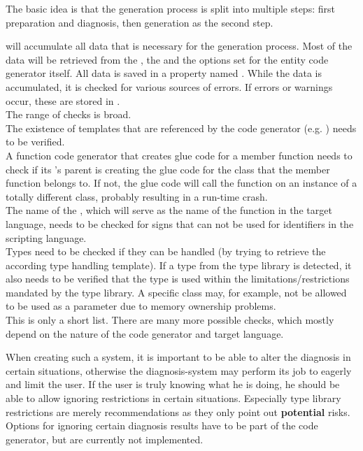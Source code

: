 The basic idea is that the generation process is split into multiple steps: first preparation and diagnosis, then generation as the second step.

 will accumulate all data that is necessary for the generation process. Most of the data will be retrieved from the , the  and the options set for the entity code generator itself. All data is saved in a property named . While the data is accumulated, it is checked for various sources of errors. If errors or warnings occur, these are stored in .\\
The range of checks is broad.\\
The existence of templates that are referenced by the code generator (e.g. ) needs to be verified.\\
A function code generator that creates glue code for a member function needs to check if its 's parent is creating the glue code for the class that the member function belongs to. If not, the glue code will call the function on an instance of a totally different class, probably resulting in a run-time crash.\\
The name of the , which will serve as the name of the function in the target language, needs to be checked for signs that can not be used for identifiers in the scripting language.\\
Types need to be checked if they can be handled (by trying to retrieve the according type handling template). If a type from the type library is detected, it also needs to be verified that the type is used within the limitations/restrictions mandated by the type library. A specific class may, for example, not be allowed to be used as a parameter due to memory ownership problems.\\
This is only a short list. There are many more possible checks, which mostly depend on the nature of the code generator and target language. 

When creating such a system, it is important to be able to alter the diagnosis in certain situations, otherwise the diagnosis-system may perform its job to eagerly and limit the user. If the user is truly knowing what he is doing, he should be able to allow ignoring restrictions in certain situations. Especially type library restrictions are merely recommendations as they only point out \textbf{potential} risks. Options for ignoring certain diagnosis results have to be part of the code generator, but are currently not implemented.

